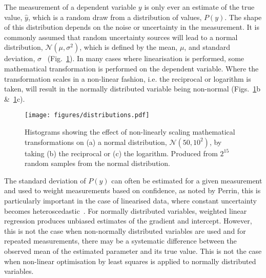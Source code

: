 \documentclass[reprint,superscriptaddress,nobibnotes,amsmath,amssymb]{revtex4-2}
\begin{document}
The measurement of a dependent variable $y$ is only ever an estimate of the true value, $\hat{y}$, which is a random draw from a distribution of values, $P(y)$. 
The shape of this distribution depends on the noise or uncertainty in the measurement. 
It is commonly assumed that random uncertainty sources will lead to a normal distribution, $\mathcal{N}(\mu, \sigma^2)$, which is defined by the mean, $\mu$, and standard deviation, $\sigma$~\cite{monk_math_2010} (Fig.~\ref{fig:distributions}).
In many cases where linearisation is performed, some mathematical transformation is performed on the dependent variable. 
Where the transformation scales in a non-linear fashion, i.e. the reciprocal or logarithm is taken, will result in the normally distributed variable being non-normal (Figs.~\ref{fig:distributions}b \&~\ref{fig:distributions}c).
%
\begin{figure}
  \texttt{[image: figures/distributions.pdf]}
  \caption{
    Histograms showing the effect of non-linearly scaling mathematical transformations on (a) a normal distribution, $\mathcal{N}(50, 10^2)$, by taking (b) the reciprocal or (c) the logarithm. 
    Produced from $2^{15}$ random samples from the normal distribution.
    }
  \label{fig:distributions}
\end{figure}
%

The standard deviation of $P(y)$ can often be estimated for a given measurement and used to weight measurements based on confidence, as noted by Perrin, this is particularly important in the case of linearised data, where constant uncertainty becomes heteroscedastic~\cite{perrin_linear_2017}.
For normally distributed variables, weighted linear regression produces unbiased estimates of the gradient and intercept. 
However, this is not the case when non-normally distributed variables are used and for repeated measurements, there may be a systematic difference between the observed mean of the estimated parameter and its true value.
This is not the case when non-linear optimisation by least squares is applied to normally distributed variables. 
\end{document}
